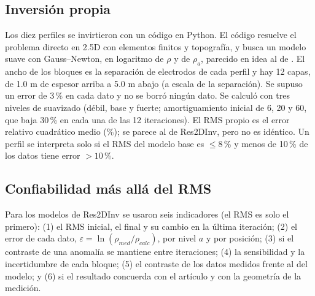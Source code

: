 \documentclass[conference]{IEEEtran}
\begin{document}
\subsection{Inversi\'on propia}
Los diez perfiles se invirtieron con un c\'odigo en Python. El c\'odigo resuelve el problema directo en 2.5D con elementos finitos y topograf\'ia, y busca un modelo suave con Gauss--Newton, en logaritmo de $\rho$ y de $\rho_a$, parecido en idea al de \cite{loke1996}. El ancho de los bloques es la separaci\'on de electrodos de cada perfil y hay 12 capas, de 1.0 m de espesor arriba a 5.0 m abajo (a escala de la separaci\'on). Se supuso un error de 3\,\% en cada dato y no se borr\'o ning\'un dato. Se calcul\'o con tres niveles de suavizado (d\'ebil, base y fuerte; amortiguamiento inicial de 6, 20 y 60, que baja 30\,\% en cada una de las 12 iteraciones). El RMS propio es el error relativo cuadr\'atico medio (\%); se parece al de Res2DInv, pero no es id\'entico. Un perfil se interpreta solo si el RMS del modelo base es $\le 8$\,\% y menos de 10\,\% de los datos tiene error $>10$\,\%.

\subsection{Confiabilidad m\'as all\'a del RMS}
Para los modelos de Res2DInv se usaron seis indicadores (el RMS es solo el primero): (1) el RMS inicial, el final y su cambio en la \'ultima iteraci\'on; (2) el error de cada dato, $\varepsilon=\ln(\rho_{med}/\rho_{calc})$, por nivel $a$ y por posici\'on; (3) si el contraste de una anomal\'ia se mantiene entre iteraciones; (4) la sensibilidad y la incertidumbre de cada bloque; (5) el contraste de los datos medidos frente al del modelo; y (6) si el resultado concuerda con el art\'iculo y con la geometr\'ia de la medici\'on.
\end{document}
